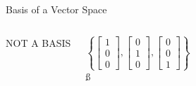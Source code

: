 \documentclass[xcolor=dvipsnames,aspectratio=169,t]{beamer}
\begin{document}
\begin{frame}{Basis of a Vector Space}
\begin{columns}[T]
{\begin{center}\alert{NOT A BASIS} \end{center}
}

\column{0.29\tw}

\[ \left\{ \begin{bmatrix} 1 \\ 0 \\ 0 \end{bmatrix} ,  \begin{bmatrix} 0 \\ 1 \\ 0 \end{bmatrix} , \begin{bmatrix} 0 \\ 0 \\ 1 \end{bmatrix} \right\} \] \ss

\begin{center}  \end{center}

\end{columns}


\end{frame}
\end{document}
